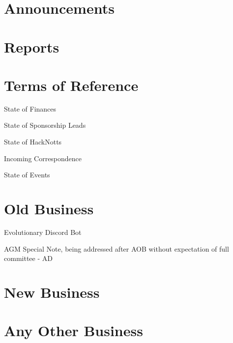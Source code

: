 \documentclass[11pt,hacksoc,agenda]{meetingmins}
\begin{document}
\maketitle

\section{Announcements}

\section{Reports}

\section{Terms of Reference}
\begin{items}
\item {State of Finances}
\item {State of Sponsorship Leads}
\item {State of HackNotts}
\item {Incoming Correspondence}
\item {State of Events}
\end{items}

\section{Old Business}
\begin{items}
\item Evolutionary Discord Bot
\item AGM
\subitem Special Note, being addressed after AOB without expectation of full committee - AD
\end{items}

\section{New Business}

\section{Any Other Business}

\vspace{1em}
\end{document}
